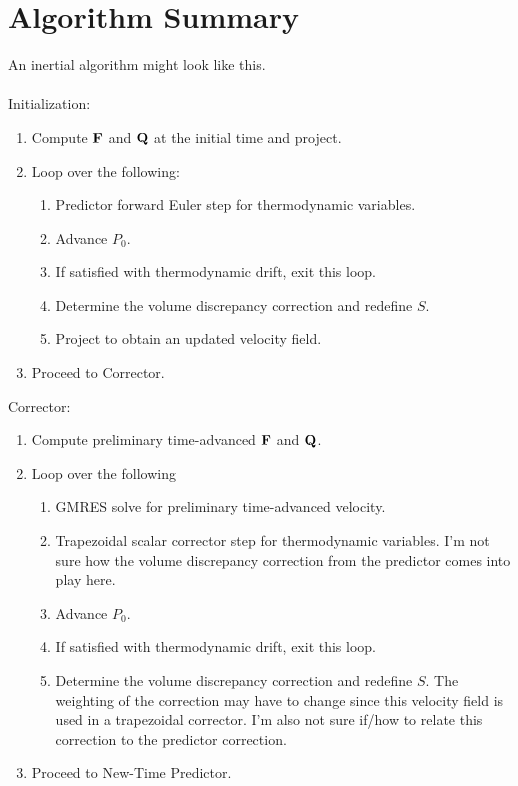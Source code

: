 \documentclass[final]{siamltex}
\def\Fb {{\bf F}}
\def\Qb {{\bf Q}}
\begin{document}
\section{Algorithm Summary}
An inertial algorithm might look like this.\\ \\
Initialization:\\
\begin{enumerate}
\item Compute $\Fb$ and $\Qb$ at the initial time and project.
\item Loop over the following:
\begin{enumerate}
\item Predictor forward Euler step for thermodynamic variables.
\item Advance $P_0$.
\item If satisfied with thermodynamic drift, exit this loop.
\item Determine the volume discrepancy correction and redefine $S$.
\item Project to obtain an updated velocity field.
\end{enumerate}
\item Proceed to Corrector.\\
\end{enumerate}
Corrector:\\
\begin{enumerate}
\item Compute preliminary time-advanced $\Fb$ and $\Qb$.
\item Loop over the following
\begin{enumerate}
\item GMRES solve for preliminary time-advanced velocity.
\item Trapezoidal scalar corrector step for thermodynamic variables.
I'm not sure how the volume discrepancy correction from the predictor comes into play here.
\item Advance $P_0$.
\item If satisfied with thermodynamic drift, exit this loop.
\item Determine the volume discrepancy correction and redefine $S$.  The weighting of the
correction may have to change since this velocity field is used in a trapezoidal corrector.
I'm also not sure if/how to relate this correction to the predictor correction.
\end{enumerate}
\item Proceed to New-Time Predictor.\\
\end{enumerate}
\end{document}
